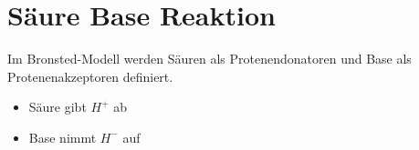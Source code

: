 \section{Säure Base Reaktion} \label{sec:säure_base_reaktion}
Im Bronsted-Modell werden Säuren als Protenendonatoren und Base als Protenenakzeptoren definiert.
\begin{multicols}{2}
    \begin{itemize}
        \item Säure gibt $H^+$ ab
        \item Base nimmt $H^-$ auf
    \end{itemize}
\end{multicols}

